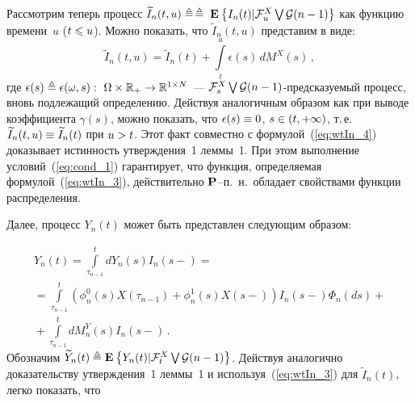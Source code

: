 \begin{multicols}{2}
{ Рассмотрим теперь процесс $\widetilde{I}_n(t,u) \triangleq$\linebreak $\triangleq\;\mathbf{E}_{  }\left\{ \mathop{I_n(t)|
 {\mathcal F}_u^X \bigvee {\mathcal G} (n-1)} \right\}$ как функцию времени~$u$ ($t \hm\leqslant u$).
 Можно показать, что
 $\widetilde{I}_n(t,u)$ представим в виде:
 \begin{equation}
 \widetilde{I}_n(t,u) = \widetilde{I}_n(t) +\int\limits_{t}^{u}\epsilon(s)\,dM^X(s)\,,
 \label{eq:wtIn_4}
 \end{equation}
 где $\epsilon(s) \ebd \epsilon(\omega,s): \
 \Omega \times \mathbb{R}_+ \hm\to \mathbb{R}^{1 \times N}$~---
 ${\mathcal F}_s^X \bigvee {\mathcal G}(n-1)$-пред\-ска\-зу\-емый процесс, вновь подлежащий
 определению. Действуя аналогичным образом как при выводе коэффициента
 $\gamma(s)$, можно показать, что $\epsilon(s) \hm\equiv 0$, $s \hm\in
 (t,+\infty)$, т.\,е.\ $\widetilde{I}_n(t,u) \hm\equiv \widetilde{I}_n(t)$ при
 $u \hm> t$. Этот факт совместно с формулой~(\ref{eq:wtIn_4}) доказывает
 истинность утверждения~1 леммы~1. При этом выполнение условий~(\ref{eq:cond_1})
 гарантирует, что функция, определяемая формулой~(\ref{eq:wtIn_3}),
 действительно ${\mathbf P}$--п.~н.\ обладает свойствами функции распределения.

 Далее, процесс $Y_n(t)$ может быть представлен следующим образом:

 \noindent
 \begin{multline*}
 Y_n(t) = \int\limits_{\tau_{n-1}}^{t}dY_n(s)I_n(s-)={} \\
 {}=
 \int\limits_{\tau_{n-1}}^{t}\left(\phi^0_{n}(s)X(\tau_{n-1})+\phi^1_{n}(s)X(s-)
 \right) I_n(s-)\Phi_{n}(ds)+{}\\
 {}+\int\limits_{\tau_{n-1}}^{t}dM^Y_n(s)I_n(s-)\,.
 \end{multline*}
 Обозначим $\widetilde{Y}_n(t) \triangleq \mathbf{E}_{  }\left\{ \mathop{Y_n(t)|{\mathcal F}_t^X \bigvee {\mathcal G}(n-1)} \right\}$.
 Действуя аналогично доказательству утверждения~1 леммы~1
 и используя~(\ref{eq:wtIn_3}) для $\widetilde{I}_n(t)$, легко показать, что

}
\end{multicols}
